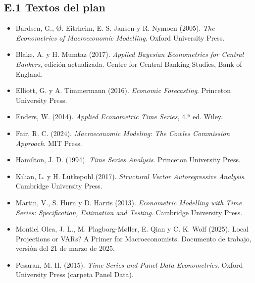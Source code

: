 \documentclass[11pt,a4paper]{article}
\begin{document}
\subsection*{E.1 Textos del plan}
{\small
\begin{itemize}[leftmargin=1.4em,itemsep=1pt,label={}]
\item Bårdsen, G., Ø. Eitrheim, E. S. Jansen y R. Nymoen (2005). \emph{The Econometrics of Macroeconomic Modelling}. Oxford University Press.
\item Blake, A. y H. Mumtaz (2017). \emph{Applied Bayesian Econometrics for Central Bankers}, edición actualizada. Centre for Central Banking Studies, Bank of England.
\item Elliott, G. y A. Timmermann (2016). \emph{Economic Forecasting}. Princeton University Press.
\item Enders, W. (2014). \emph{Applied Econometric Time Series}, 4.ª ed. Wiley.
\item Fair, R. C. (2024). \emph{Macroeconomic Modeling: The Cowles Commission Approach}. MIT Press.
\item Hamilton, J. D. (1994). \emph{Time Series Analysis}. Princeton University Press.
\item Kilian, L. y H. Lütkepohl (2017). \emph{Structural Vector Autoregressive Analysis}. Cambridge University Press.
\item Martin, V., S. Hurn y D. Harris (2013). \emph{Econometric Modelling with Time Series: Specification, Estimation and Testing}. Cambridge University Press.
\item Montiel Olea, J. L., M. Plagborg-Møller, E. Qian y C. K. Wolf (2025). Local Projections or VARs? A Primer for Macroeconomists. Documento de trabajo, versión del 21 de marzo de 2025.
\item Pesaran, M. H. (2015). \emph{Time Series and Panel Data Econometrics}. Oxford University Press (carpeta Panel Data).
\end{itemize}
}
\end{document}
